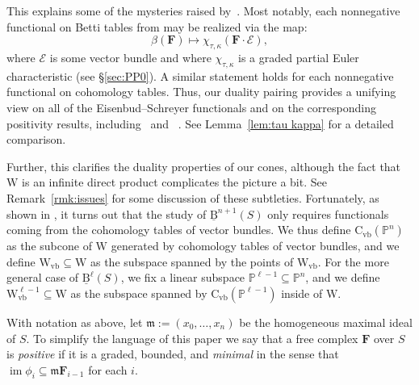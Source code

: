 \documentclass[12pt]{amsart}
\theoremstyle{definition}
\theoremstyle{remark}
\newcommand{\im}{\operatorname{im}}
\newcommand{\PP}{\mathbb{P}}
\newcommand{\WW}{\mathrm{W}}
\newcommand{\Wvb}{\mathrm{W}_{\text{vb}}}
\newcommand{\cE}{\mathcal{E}}
\newcommand{\FF}{\mathbf{F}}
\newcommand{\CvbQ}{\mathrm{C}_{\text{vb}}}
\newcommand{\BBQ}{\underline{\mathrm{B}}}
\begin{document}
This explains some of the mysteries raised by~\cite{eis-schrey1}.  Most notably, each nonnegative functional on Betti tables from \cite[\S4]{eis-schrey1} may be realized via the map:
\[
\beta(\FF)\mapsto \chi_{\tau,\kappa}(\FF\cdot \cE),
\]
where $\cE$ is some vector bundle and where $\chi_{\tau,\kappa}$ is a graded partial Euler characteristic (see \S\ref{sec:PP0}).
A similar statement holds for each nonnegative functional on cohomology tables.  Thus, our duality pairing provides a unifying view on all of the Eisenbud--Schreyer functionals and on the corresponding positivity results, including~\cite[Positivity 1]{eis-schrey-icm} and~ \cite[Positivity 2]{eis-schrey-icm}.  See Lemma~\ref{lem:tau kappa} for a detailed comparison.

Further, this clarifies the duality properties of our cones, although the fact that $\WW$ is an infinite direct product complicates the picture a bit.  See Remark~\ref{rmk:issues} for some discussion of these subtleties.  Fortunately, as shown in \cite{eis-schrey1}, it turns out that the study of $\BBQ^{n+1}(S)$ only requires functionals coming from the cohomology tables of vector bundles.  We thus define $\CvbQ(\PP^n)$ as the subcone of $\WW$ generated by cohomology tables of vector bundles, and we define $\Wvb\subseteq \WW$ as the subspace spanned by the points of $\Wvb$.
For the more general case of $\BBQ^{\ell}(S)$, we fix a linear subspace $\PP^{\ell-1}\subseteq \PP^n$, and we define $\Wvb^{\ell-1}\subseteq \WW$ as the subspace spanned by $\CvbQ(\PP^{\ell-1})$ inside of $\WW$.

With notation as above, let $\mathfrak m:=(x_0, \dots, x_n)$ be the homogeneous maximal ideal of $S$.  To simplify the language of this paper we say that
a free complex $\FF$ over $S$ is \emph{positive} if it is a graded, bounded,
and \emph{minimal} in the sense that $\im \phi_{i}\subseteq \mathfrak m \FF_{i-1}$ for each $i$. 
\end{document}
